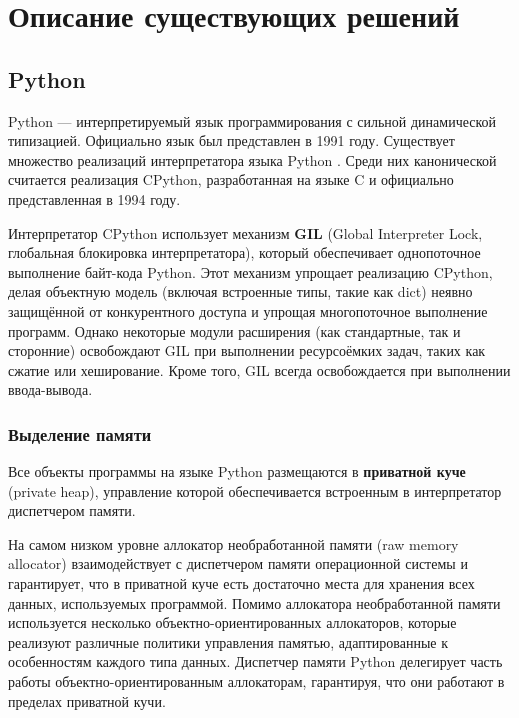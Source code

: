 \chapter{Описание существующих решений}

\section{Python}

Python \cite{python} --- интерпретируемый язык программирования с сильной динамической типизацией. Официально язык был представлен в 1991 году. Существует множество реализаций интерпретатора языка Python \cite{juthon} \cite{ironpython} \cite{pypy}. Среди них канонической считается реализация CPython, разработанная на языке C и официально представленная в 1994 году. \cite{cpython}

Интерпретатор CPython использует механизм \textbf{GIL} (Global Interpreter Lock, глобальная блокировка интерпретатора), который обеспечивает однопоточное выполнение байт-кода Python. Этот механизм упрощает реализацию CPython, делая объектную модель (включая встроенные типы, такие как dict) неявно защищённой от конкурентного доступа и упрощая многопоточное выполнение программ. Однако некоторые модули расширения (как стандартные, так и сторонние) \cite{python_extensions} освобождают GIL при выполнении ресурсоёмких задач, таких как сжатие или хеширование. Кроме того, GIL всегда освобождается при выполнении ввода-вывода. \cite{gil}

\subsection{Выделение памяти}

Все объекты программы на языке Python размещаются в \textbf{приватной куче} (private heap), управление которой обеспечивается встроенным в интерпретатор диспетчером памяти. \cite{python_memory}

На самом низком уровне аллокатор необработанной памяти (raw memory allocator) взаимодействует с диспетчером памяти операционной системы и гарантирует, что в приватной куче есть достаточно места для хранения всех данных, используемых программой. Помимо аллокатора необработанной памяти используется несколько объектно-ориентированных аллокаторов, которые реализуют различные политики управления памятью, адаптированные к особенностям каждого типа данных. Диспетчер памяти Python делегирует часть работы объектно-ориентированным аллокаторам, гарантируя, что они работают в пределах приватной кучи. \cite{python_memory}

